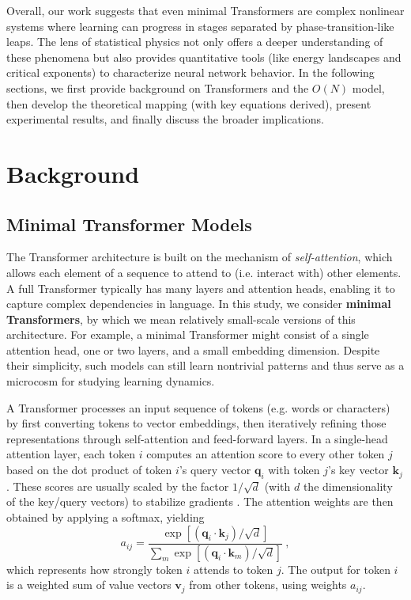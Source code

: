 \documentclass[12pt]{article}
\begin{document}
Overall, our work suggests that even minimal Transformers are complex nonlinear systems where learning can progress in stages separated by phase-transition-like leaps. The lens of statistical physics not only offers a deeper understanding of these phenomena but also provides quantitative tools (like energy landscapes and critical exponents) to characterize neural network behavior. In the following sections, we first provide background on Transformers and the $O(N)$ model, then develop the theoretical mapping (with key equations derived), present experimental results, and finally discuss the broader implications.

\section{Background}
\subsection{Minimal Transformer Models}
The Transformer architecture \citep{vaswani2017} is built on the mechanism of \emph{self-attention}, which allows each element of a sequence to attend to (i.e. interact with) other elements. A full Transformer typically has many layers and attention heads, enabling it to capture complex dependencies in language. In this study, we consider \textbf{minimal Transformers}, by which we mean relatively small-scale versions of this architecture. For example, a minimal Transformer might consist of a single attention head, one or two layers, and a small embedding dimension. Despite their simplicity, such models can still learn nontrivial patterns and thus serve as a microcosm for studying learning dynamics.

A Transformer processes an input sequence of tokens (e.g. words or characters) by first converting tokens to vector embeddings, then iteratively refining those representations through self-attention and feed-forward layers. In a single-head attention layer, each token $i$ computes an attention score to every other token $j$ based on the dot product of token $i$'s query vector $\mathbf{q}_i$ with token $j$'s key vector $\mathbf{k}_j$. These scores are usually scaled by the factor $1/\sqrt{d}$ (with $d$ the dimensionality of the key/query vectors) to stabilize gradients \citep{vaswani2017}. The attention weights are then obtained by applying a softmax, yielding 
\begin{equation}
    a_{ij} = \frac{\exp[(\mathbf{q}_i \cdot \mathbf{k}_j)/\sqrt{d}]}{\sum_{m} \exp[(\mathbf{q}_i \cdot \mathbf{k}_m)/\sqrt{d}]}~,
\end{equation}
which represents how strongly token $i$ attends to token $j$. The output for token $i$ is a weighted sum of value vectors $\mathbf{v}_j$ from other tokens, using weights $a_{ij}$.
\end{document}
